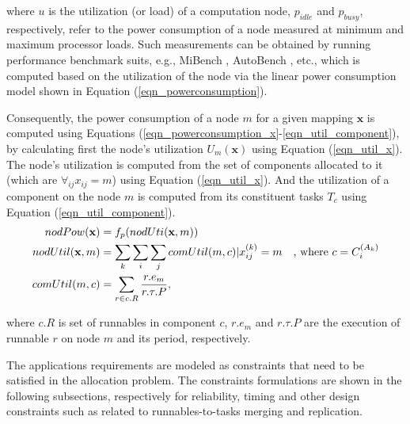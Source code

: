 where $u$ is the utilization (or load) of a computation node, $p_{idle}$ and $p_{busy}$, respectively, refer to the power consumption of a node measured at minimum and maximum processor loads. Such measurements can be obtained by running performance benchmark suits, e.g., MiBench \cite{Guthaus2001MiBench:Suite}, AutoBench \cite{EMBC2018AutoBenchProcessors}, etc., which is computed based on the utilization of the node via the linear power consumption model shown in Equation (\ref{eqn_powerconsumption}).

Consequently, the power consumption of a node $m$ for a given mapping $\textbf{x}$ is computed using Equations (\ref{eqn_powerconsumption_x}-\ref{eqn_util_component}), by calculating first the node's utilization $U_m(\textbf{x})$ using Equation (\ref{eqn_util_x}). The node's utilization is computed from the set of components allocated to it (which are $\forall_{ij} x_{ij}=m$) using Equation (\ref{eqn_util_x}). And the utilization of a component on the node $m$ is computed from its constituent tasks $T_c$ using Equation (\ref{eqn_util_component}).
\begin{align}
	\label{eqn_powerconsumption_x}
nodPow(\textbf{x}) & =f_p(nodUti(\textbf{x},m))                         &  \\
	\label{eqn_util_x}
nodUtil(\textbf{x},m)           & = \sum_{k}{\sum_{i}{\sum_{j}{comUtil(m,c)}}}|\xkij=m         & \text{, where } c=\ttsss{C}\\
	\label{eqn_util_component}
comUtil(m,c)              & = \sum_{r\in c.R} \frac{r.e_m}{r.\tau.P}, &
\end{align}

where $c.R$ is set of runnables in component $c$, $r.e_m$ and $r.\tau.P$ are the execution of runnable $r$ on node $m$ and its period, respectively.

The applications requirements are modeled as constraints that need to be satisfied in the allocation problem. The constraints formulations are shown in the following subsections, respectively for reliability, timing and other design constraints such as related to runnables-to-tasks merging and replication.


